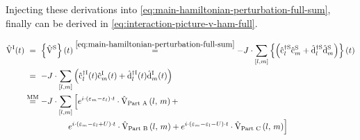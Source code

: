 Injecting these derivations into \autoref{eq:main-hamiltonian-perturbation-full-sum}, finally \VhamiltonianOfT[\interactionPicture] can be derived in \autoref{eq:interaction-picture-v-ham-full}.

\begin{equation}
    \label{eq:interaction-picture-v-ham-full}
    \begin{split}
        \VhamiltonianOfT[\interactionPicture] &
        \stackrel{\phantom{\text{MM}}}{=}
        \left\{\Vhamiltonian[\schroedingerPicture]\right\}(t) \stackrel{\ref{eq:main-hamiltonian-perturbation-full-sum}}{=}
        - J \cdot \fullneighborsum{l}{m}  \left\{
              \left(\cop[\schroedingerPicture]{l}{\dagger}\cop[\schroedingerPicture]{m}{} + \dop[\schroedingerPicture]{l}{\dagger}\dop[\schroedingerPicture]{m}{} \right)
        \right\}(t) \\
        &\stackrel{\phantom{\text{MM}}}{=}
        -J \cdot \fullneighborsum{l}{m}\left(\copOfT[\interactionPicture]{l}{\dagger}\copOfT[\interactionPicture]{m}{} + \dopOfT[\interactionPicture]{l}{\dagger}\dopOfT[\interactionPicture]{m}{} \right)\\
        &\stackrel{\text{MM}}{=}
        -J \cdot \fullneighborsum{l}{m} \left[
            e^{i\cdot \left(\epsl[m]-\epsl\right)\cdot t} \cdot \VhamiltonianPartA{l}{m} + 
            \right.\\
            &\qquad\qquad\quad
            \left.
            e^{i\cdot \left(\epsl[m]-\epsl + U\right)\cdot t} \cdot \VhamiltonianPartB{l}{m} + 
            e^{i\cdot \left(\epsl[m]-\epsl - U\right)\cdot t} \cdot \VhamiltonianPartC{l}{m} 
        \right]
    \end{split}
\end{equation}


